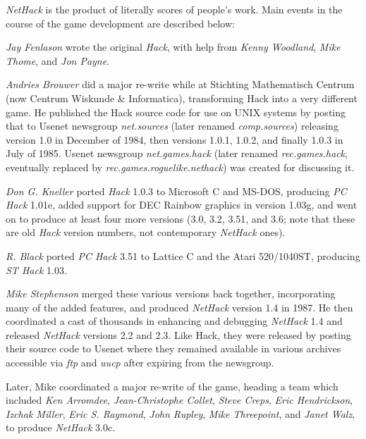 \documentclass[titlepage]{article}
\begin{document}
\textit{NetHack} is the product of literally scores of people's work.
Main events in the course of the game development are described below:

\bigskip
\noindent \textit{Jay Fenlason} wrote the original \textit{Hack}, with help from {\it
Kenny Woodland}, \textit{Mike Thome}, and \textit{Jon Payne}.

\medskip
\noindent \textit{Andries Brouwer} did a major re-write while at
Stichting Mathematisch Centrum (now Centrum Wiskunde \& Informatica),
transforming Hack into a very different game.
He published the Hack source code for use on UNIX
systems by posting that to Usenet
newsgroup \textit{net.sources} (later renamed \textit{comp.sources})
releasing version 1.0 in December of 1984, then versions 1.0.1, 1.0.2,
and finally 1.0.3 in July of 1985.
Usenet newsgroup \textit{net.games.hack} (later
renamed \textit{rec.games.hack}, eventually replaced
by \textit{rec.games.roguelike.nethack})
was created for discussing it.

\medskip
\noindent \textit{Don G. Kneller} ported \textit{Hack} 1.0.3 to Microsoft C and MS-DOS,
producing \textit{PC Hack} 1.01e, added support for DEC Rainbow graphics in
version 1.03g, and went on to produce at least four more versions (3.0, 3.2,
3.51, and 3.6;
note that these are old \textit{Hack} version numbers, not contemporary
\textit{NetHack} ones).

\medskip
\noindent \textit{R. Black} ported \textit{PC Hack} 3.51 to Lattice C and the Atari
520/1040ST, producing \textit{ST Hack} 1.03.

\medskip
\noindent \textit{Mike Stephenson} merged these various versions back together,
incorporating many of the added features, and produced \textit{NetHack} version
1.4 in 1987.
He then coordinated a cast of thousands in enhancing and debugging
\textit{NetHack} 1.4 and released \textit{NetHack} versions 2.2 and 2.3.
Like Hack, they were released by posting their source code to Usenet where
they remained available in various archives accessible
via \textit{ftp} and \textit{uucp} after expiring from the newsgroup.

\medskip
\noindent Later, Mike coordinated a major re-write of the game, heading a team which
included \textit{Ken Arromdee}, \textit{Jean-Christophe Collet}, \textit{Steve Creps},
\textit{Eric Hendrickson}, \textit{Izchak Miller}, \textit{Eric S. Raymond}, \textit{John
Rupley}, \textit{Mike Threepoint}, and \textit{Janet Walz}, to produce
\textit{NetHack} 3.0c.
\end{document}
